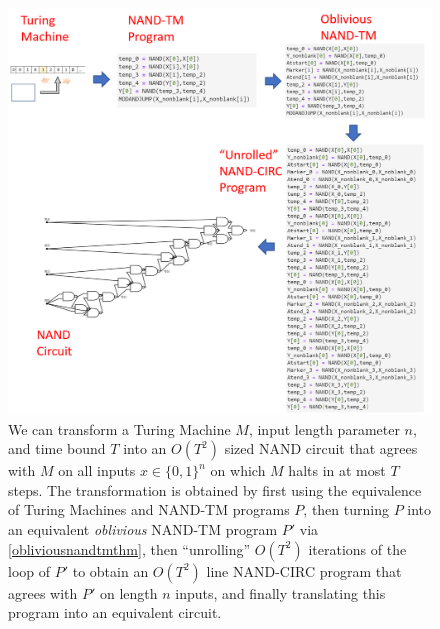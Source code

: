 \begin{figure}
\centering
\includegraphics[width=\textwidth, height=0.25\paperheight, keepaspectratio]{../figure/unrolldescription.png}
\caption{We can transform a Turing Machine \(M\), input length parameter
\(n\), and time bound \(T\) into an \(O(T^2)\) sized NAND circuit that
agrees with \(M\) on all inputs \(x\in \{0,1\}^n\) on which \(M\) halts
in at most \(T\) steps. The transformation is obtained by first using
the equivalence of Turing Machines and NAND-TM programs \(P\), then
turning \(P\) into an equivalent \emph{oblivious} NAND-TM program \(P'\)
via \cref{obliviousnandtmthm}, then ``unrolling'' \(O(T^2)\) iterations
of the loop of \(P'\) to obtain an \(O(T^2)\) line NAND-CIRC program
that agrees with \(P'\) on length \(n\) inputs, and finally translating
this program into an equivalent circuit.}
\label{unrolldescriptionfig}
\end{figure}

\hypertarget{unrollloop}{}

